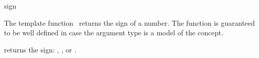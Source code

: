 \begin{ccRefFunction}{sign}

\ccDefinition

The template function \ccRefName\ returns the sign of a number.
The function is guaranteed to be well defined in case the argument type 
is a model of the  concept. 


{returns the sign: , , or .}

\ccSeeAlso

\\
\\

\end{ccRefFunction}
